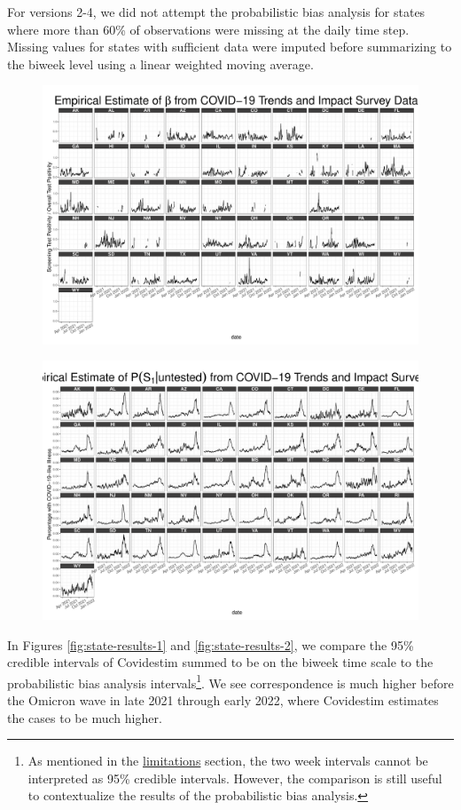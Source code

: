 \documentclass[12pt,twoside]{smiththesis}
\begin{document}
For versions 2-4, we did not attempt the probabilistic bias analysis for states where more than 60\% of observations were missing at the daily time step. Missing values for states with sufficient data were imputed before summarizing to the biweek level using a linear weighted moving average.
\begin{figure}
\includegraphics[width=0.9\linewidth]{figure/ctis_beta_states} \caption{\label{fig:statectis}}\label{fig:unnamed-chunk-78}
\end{figure}
\begin{figure}
\includegraphics[width=0.9\linewidth]{figure/ctis_s_untested_states} \caption{\label{fig:statectis-s-untested}}\label{fig:unnamed-chunk-79}
\end{figure}
In Figures \ref{fig:state-results-1} and \ref{fig:state-results-2}, we compare the 95\% credible intervals of Covidestim summed to be on the biweek time scale to the probabilistic bias analysis intervals\footnote{As mentioned in the \protect\hyperlink{lims}{limitations} section, the two week intervals cannot be interpreted as 95\% credible intervals. However, the comparison is still useful to contextualize the results of the probabilistic bias analysis.}. We see correspondence is much higher before the Omicron wave in late 2021 through early 2022, where Covidestim estimates the cases to be much higher.
\end{document}
